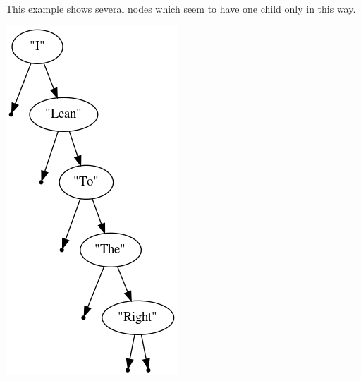 \documentclass[11pt]{article}
\begin{document}
This example shows several nodes which seem to have one child only
in this way.
\begin{center}
\includegraphics[width=\textwidth]{./media/BinTree2.png}
\end{center}
\end{document}
